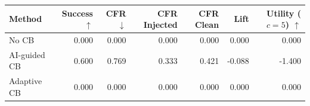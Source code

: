 \begin{tabular}{lrrrrrr}
\toprule
Method & Success $\uparrow$ & CFR $\downarrow$ & CFR Injected & CFR Clean & Lift & Utility ($c=5$) $\uparrow$ \\
\midrule
No CB & 0.000 & 0.000 & 0.000 & 0.000 & 0.000 & 0.000 \\
AI-guided CB & 0.600 & 0.769 & 0.333 & 0.421 & -0.088 & -1.400 \\
Adaptive CB & 0.000 & 0.000 & 0.000 & 0.000 & 0.000 & 0.000 \\
\bottomrule
\end{tabular}
